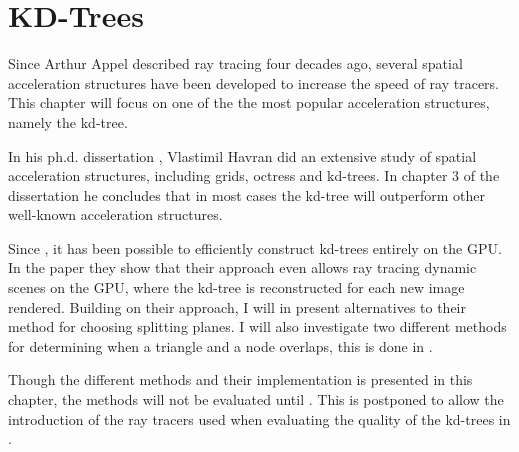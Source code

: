 \chapter{KD-Trees}\label{chp:kdTrees}






Since Arthur Appel described ray tracing four decades ago, several
spatial acceleration structures have been developed to increase the
speed of ray tracers. This chapter will focus on one of the the most
popular acceleration structures, namely the kd-tree.


In his ph.d. dissertation , Vlastimil Havran did
an extensive study of spatial acceleration structures, including
grids, octress and kd-trees. In chapter 3 of the dissertation he
concludes that in most cases the kd-tree will outperform other
well-known acceleration structures.

Since \zhou{}, it has been possible to efficiently construct kd-trees entirely
on the GPU. In the paper they show that their approach even allows ray tracing
dynamic scenes on the GPU, where the kd-tree is reconstructed for each new image
rendered. Building on their approach, I will in 
present alternatives to their method for choosing splitting planes. I will also
investigate two different methods for determining when a triangle and a node
overlaps, this is done in .

Though the different methods and their implementation is presented in this
chapter, the methods will not be evaluated until . This
is postponed to allow the introduction of the ray tracers used when evaluating
the quality of the kd-trees in .


